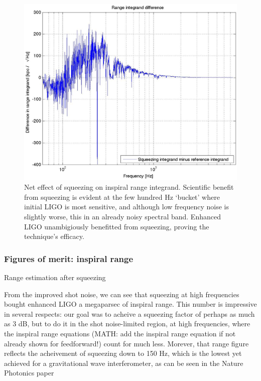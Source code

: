 \begin{figure}
\begin{center}
\includegraphics[height=0.5\paperheight, width=0.5\paperwidth,keepaspectratio]{range_integrand_difference.eps}
\caption{Net effect of squeezing on inspiral range integrand. Scientific benefit from squeezing is evident at the few hundred Hz `bucket' where initial LIGO is most sensitive, and although low frequency noise is slightly worse, this in an already noisy spectral band. Enhanced LIGO unambigiously benefitted from squeezing, proving the technique's efficacy.
}
\end{center}
\end{figure}




            \subsubsection{Figures of merit: inspiral range}
            \label{range_est}

                Range estimation after squeezing

		From the improved shot noise, we can see that squeezing at high frequencies bought enhanced LIGO a megaparsec of inspiral range. This number is impressive in several respects: our goal was to acheive a squeezing factor of perhaps as much as 3 dB, but to do it in the shot noise-limited region, at high frequencies, where the inspiral range equations (MATH: add the inspiral range equation if not already shown for feedforward!) count for much less. Morever, that range figure reflects the acheivement of squeezing down to 150 Hz, which is the lowest yet achieved for a gravitational wave interferometer, as can be seen in the Nature Photonics paper~\cite{BarsottiNatureSqueezing}


